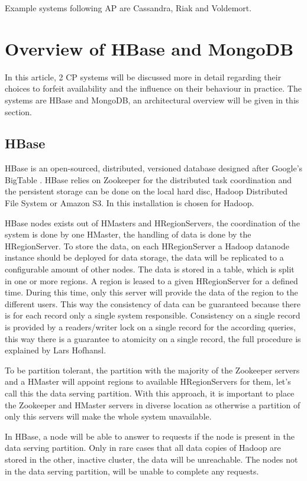 \documentclass[final,5p,times]{elsarticle}
\begin{document}
Example systems following AP are Cassandra, Riak and Voldemort. 

\section{Overview of HBase and MongoDB}\label{sec:hbaseandmongodb}
In this article, 2 CP systems will be discussed more in detail regarding their choices to forfeit availability and the influence on their behaviour in practice. The systems are HBase and MongoDB, an architectural overview will be given in this section. 

\subsection{HBase}
HBase\cite{hbase-doc} is an open-sourced, distributed, versioned database designed after Google's BigTable \cite{chang2008bigtable}. HBase relies on Zookeeper for the distributed task coordination and the persistent storage can be done on the local hard disc, Hadoop Distributed File System or Amazon S3. In this installation is chosen for Hadoop. 

HBase nodes exists out of HMasters and HRegionServers, the coordination of the system is done by one HMaster, the handling of data is done by the HRegionServer. To store the data, on each HRegionServer a Hadoop datanode instance should be deployed for data storage, the data will be replicated to a configurable amount of other nodes. The data is stored in a table, which is split in one or more regions. A region is leased to a given HRegionServer for a defined time. During this time, only this server will provide the data of the region to the different users. This way the consistency of data can be guaranteed because there is for each record only a single system responsible. Consistency on a single record is provided by a readers/writer lock on a single record for the according queries, this way there is a guarantee to atomicity on a single record, the full procedure is explained by Lars Hofhansl\cite{hbase-acid}. 

To be partition tolerant, the partition with the majority of the Zookeeper servers and a HMaster will appoint regions to available HRegionServers for them, let's call this the data serving partition. With this approach, it is important to place the Zookeeper and HMaster servers in diverse location as otherwise a partition of only this servers will make the whole system unavailable. 

In HBase, a node will be able to answer to requests if the node is present in the data serving partition. Only in rare cases that all data copies of Hadoop are stored in the other, inactive cluster, the data will be unreachable. The nodes not in the data serving partition, will be unable to complete any requests. 
\end{document}
